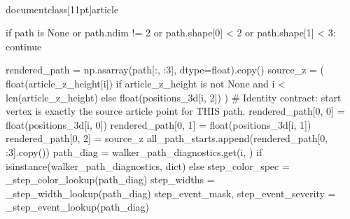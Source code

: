 \\documentclass[11pt]{article}
\begin{document}
\begin{CodeBlock}
{{        if path is None or path.ndim != 2 or path.shape[0] < 2 or path.shape[1] < 3:
            continue

        rendered_path = np.asarray(path[:, :3], dtype=float).copy()
        source_z = (
            float(article_z_height[i])
            if article_z_height is not None and i < len(article_z_height)
            else float(positions_3d[i, 2])
        )
        # Identity contract: start vertex is exactly the source article point for THIS path.
        rendered_path[0, 0] = float(positions_3d[i, 0])
        rendered_path[0, 1] = float(positions_3d[i, 1])
        rendered_path[0, 2] = source_z
        all_path_starts.append(rendered_path[0, :3].copy())
        path_diag = walker_path_diagnostics.get(i, {}) if isinstance(walker_path_diagnostics, dict) else {}
        step_color_spec = _step_color_lookup(path_diag)
        step_widths = _step_width_lookup(path_diag)
        step_event_mask, step_event_severity = _step_event_lookup(path_diag)

}}
\end{CodeBlock}
\end{document}
